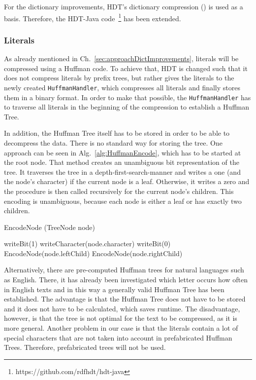 For the dictionary improvements, HDT's dictionary compression (\DHDT{}) is used as a basis. Therefore, the HDT-Java code~\footnote{https://github.com/rdfhdt/hdt-java} has been extended.

\subsubsection{Literals}\label{sec:implementationLiterals}

As already mentioned in Ch.~\ref{sec:approachDictImprovements}, literals will be compressed using a Huffman code. To achieve that, HDT is changed such that it does not compress literals by prefix trees, but rather gives the literals to the newly created {\tt HuffmanHandler}, which compresses all literals and finally stores them in a binary format. In order to make that possible, the {\tt HuffmanHandler} has to traverse all literals in the beginning of the compression to establish a Huffman Tree.

In addition, the Huffman Tree itself has to be stored in order to be able to decompress the data. There is no standard way for storing the tree. One approach can be seen in Alg.~\ref{alg:HuffmanEncode}, which has to be started at the root node. That method creates an unambiguous bit representation of the tree. It traverses the tree in a depth-first-search-manner and writes a one (and the node's character) if the current node is a leaf. Otherwise, it writes a zero and the procedure is then called recursively for the current node's children. This encoding is unambiguous, because each node is either a leaf or has exactly two children.

\begin{algorithm}
	\caption{EncodeNode (TreeNode node)}\label{alg:HuffmanEncode}
	\begin{algorithmic}[1]
		\State writeBit(1)
		\State writeCharacter(node.character)
		\Else
		\State writeBit(0)
		\State EncodeNode(node.leftChild)
		\State EncodeNode(node.rightChild)
		\EndIf
	\end{algorithmic}
\end{algorithm}


Alternatively, there are pre-computed Huffman trees for natural languages such as English. There, it has already been investigated which letter occurs how often in English texts and in this way a generally valid Huffman Tree has been established. The advantage is that the Huffman Tree does not have to be stored and it does not have to  be calculated, which saves runtime. The disadvantage, however, is that the tree is not optimal for the text to be compressed, as it is more general. Another problem in our case is that the literals contain a lot of special characters that are not taken into account in prefabricated Huffman Trees. Therefore, prefabricated trees will not be used.

